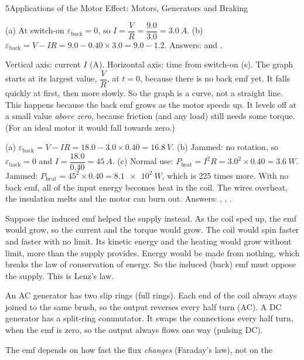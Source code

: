\begin{chapteranswers}{5}{Applications of the Motor Effect: Motors, Generators and Braking}
  \item (a) At switch-on $\varepsilon_\mathrm{back} = 0$, so
        $I = \dfrac{V}{R} = \dfrac{9.0}{3.0} = \qty{3.0}{A}$.
        (b) $\varepsilon_\mathrm{back} = V - IR = 9.0 - 0.40 \times 3.0 = 9.0 - 1.2$.
        Answers:  and
        .
  \item Vertical axis: current $I$ (\si{A}). Horizontal axis: time from switch-on
        (\si{s}). The graph starts at its largest value, $\dfrac{V}{R}$, at $t = 0$,
        because there is no back emf yet. It falls quickly at first, then more slowly.
        So the graph is a curve, not a straight line. This happens because the back emf
        grows as the motor speeds up. It levels off at a small value \emph{above zero},
        because friction (and any load) still needs some torque. (For an ideal motor it
        would fall towards zero.)
  \item (a) $\varepsilon_\mathrm{back} = V - IR = 18.0 - 3.0 \times 0.40 = \qty{16.8}{V}$.
        (b) Jammed: no rotation, so $\varepsilon_\mathrm{back} = 0$ and
        $I = \dfrac{18.0}{0.40} = \qty{45}{A}$.
        (c) Normal use: $P_\mathrm{heat} = I^2R = 3.0^2 \times 0.40 = \qty{3.6}{W}$.
        Jammed: $P_\mathrm{heat} = 45^2 \times 0.40 = \qty{8.1e2}{W}$, which is 225 times
        more. With no back emf, all of the input energy becomes heat in the coil. The
        wires overheat, the insulation melts and the motor can burn out.
        Answers: , ,
        .
  \item Suppose the induced emf helped the supply instead. As the coil sped up, the
        emf would grow, so the current and the torque would grow. The coil would spin
        faster and faster with no limit. Its kinetic energy and the heating would grow
        without limit, more than the supply provides. Energy would be made from nothing,
        which breaks the law of conservation of energy. So the induced (back) emf must
        oppose the supply. This is Lenz's law.
  \item An AC generator has two slip rings (full rings). Each end of the coil always
        stays joined to the same brush, so the output reverses every half turn (AC).
        A DC generator has a split-ring commutator. It swaps the connections every half
        turn, when the emf is zero, so the output always flows one way (pulsing DC).
  \item The emf depends on how fast the flux \emph{changes} (Faraday's law), not on the

\end{chapteranswers}
